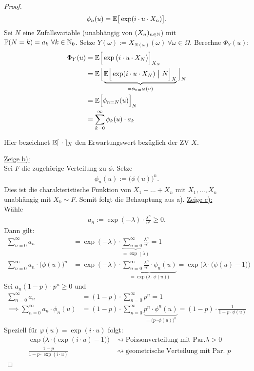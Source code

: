 \documentclass[12pt,a4paper]{article}
\begin{document}
\begin{proof}
	\begin{align*}
		\phi_n(u)=\mathbb{E}\big[\exp(i\cdot u\cdot X_n)\big].
	\end{align*}
	Sei $N$ eine Zufallsvariable (unabhängig von $(X_n)_{n\in\mathbb{N}}$) mit $\mathbb{P}(N=k)=a_k~\forall k\in\mathbb{N}_0$.
	Setze $Y(\omega):=X_{N(\omega)}(\omega)~\forall\omega\in\Omega$.
	Berechne $\Phi_Y(u)$:
	\begin{align*}
		\Phi_Y(u)
		&=\mathbb{E}\Big[\exp\big(i\cdot u\cdot X_N\big)\Big]_{X_N}\\
		&=\mathbb{E}\Big[\underbrace{\mathbb{E}\Big[\exp(i\cdot u\cdot X_N)~\big|~N\Big]_X}_{=\phi_{n=N}(u)}\Big]_N\\
		&=\mathbb{E}\Big[\phi_{n=N}(u)\Big]_N\\
		&=\sum\limits_{k=0}^\infty\phi_k(u)\cdot a_k
	\end{align*}

	Hier bezeichnet $\mathbb{E}[~\cdot~]_X$ den Erwartungswert bezüglich der ZV $X$.
	
	\underline{Zeige b):}\\
	Sei $F$ die zugehörige Verteilung zu $\phi$.
	Setze
	\begin{align*}
		\phi_n(u):=\big(\phi(u)\big)^n.
	\end{align*}
	Dies ist die charakteristische Funktion von $X_1+\ldots+X_n$ mit $X_1,\ldots,X_n$ unabhängig mit $X_k\sim F$.
	Somit folgt die Behauptung aus a).\nl
	\underline{Zeige c):}\\
	Wähle
	\begin{align*}
		a_n:=\exp(-\lambda)\cdot\frac{\lambda^n}{n!}\geq0.
	\end{align*}
	Dann gilt:
	\begin{align*}
		\sum\limits_{n=0}^\infty a_n
		&=\exp(-\lambda)\cdot\underbrace{\sum\limits_{n=0}^\infty\frac{\lambda^n}{n!}}_{=\exp(\lambda)}=1\\
		\sum\limits_{n=0}^\infty a_n\cdot\big(\phi(u)\big)^n
		&=\exp(-\lambda)\cdot\underbrace{\sum\limits_{n=0}^\infty\frac{\lambda^n}{n!}\cdot\phi_n(u)}_{=\exp\big(\lambda\cdot\phi(u)\big)}
		=\exp\Big(\lambda\cdot\big(\phi(u)-1\big)\Big)
	\end{align*}
	Sei $a_n(1-p)\cdot p^n\geq0$ und 
	\begin{align*}
		\sum\limits_{n=0}^\infty a_n&=(1-p)\cdot\sum\limits_{n=0}^\infty p^n=1\\
		\implies
		\sum\limits_{n=0}^\infty a_n\cdot\phi_n(u)
		&=(1-p)\cdot\sum\limits_{n=0}^\infty\underbrace{p^n\cdot\phi^n(u)}_{=\big(p\cdot\phi(u)\big)^n}
		=(1-p)\cdot\frac{1}{1-p\cdot\phi(u)}
	\end{align*}		
	Speziell für $\varphi(u)=\exp(i\cdot u)$ folgt:
	\begin{align*}
		&\exp\Big(\lambda\cdot\big(\exp(i\cdot u)-1\big)\Big) &\rightsquigarrow\text{Poissonverteilung mit Par.}\lambda>0\\
		&\frac{1-p}{1-p\cdot\exp(i\cdot u)}	&\rightsquigarrow\text{geometrische Verteilung mit Par. }p
	\end{align*}
\end{proof}
\end{document}
